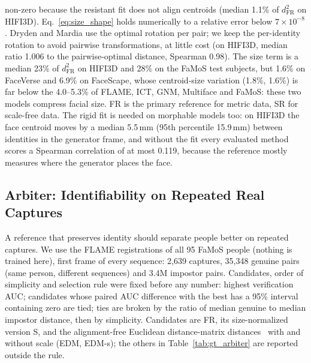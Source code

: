non-zero because the resistant fit does not align centroids (median 1.1\% of
$d_{\mathrm{FR}}^2$ on HIFI3D). Eq.~\eqref{eq:size_shape} holds numerically
to a relative error below $7\times10^{-8}$.
Dryden and Mardia use the optimal rotation per pair; we keep the
per-identity rotation to avoid pairwise transformations, at little cost (on
HIFI3D, median ratio 1.006 to the pairwise-optimal distance, Spearman 0.98).
The size term is a median 23\% of $d_{\mathrm{FR}}^2$ on HIFI3D and 28\% on
the FaMoS test subjects, but 1.6\% on FaceVerse and 6.9\% on FaceScape,
whose centroid-size variation (1.8\%, 1.6\%) is far below the 4.0--5.3\% of
FLAME, ICT, GNM, Multiface and FaMoS: these two models compress facial size.
FR is the primary reference for metric data, SR for scale-free data. The
rigid fit is needed on morphable models too: on HIFI3D the face centroid moves
by a median 5.5\,mm (95th percentile 15.9\,mm) between identities in the
generator frame, and without the fit every evaluated method scores a Spearman
correlation of at most 0.119, because the reference mostly measures where the
generator places the face.

\subsection{Arbiter: Identifiability on Repeated Real Captures}
\label{sec:gt_arbiter}

A reference that preserves identity should separate people better on
repeated captures. We use the FLAME registrations of all 95 FaMoS people
(nothing is trained here), first frame of every sequence: 2{,}639 captures,
35{,}348 genuine pairs (same person, different sequences) and 3.4M impostor
pairs.
Candidates, order of simplicity and selection rule were fixed before any
number: highest verification AUC; candidates whose paired AUC difference with
the best has a 95\% interval containing zero are tied; ties are broken by the
ratio of median genuine to median impostor distance, then by simplicity.
Candidates are FR, its size-normalized version S, and the alignment-free
Euclidean distance-matrix distances~\cite{lele1991edma} with and without
scale (EDM, EDM-s); the others in Table~\ref{tab:gt_arbiter} are reported
outside the rule.

